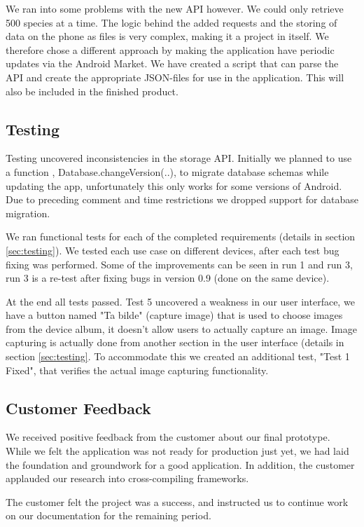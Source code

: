   We ran into some problems with the new API however. We could only retrieve 500
  species at a time. The logic behind the added requests and the storing of data
  on the phone as files is very complex, making it a project in itself. We
  therefore chose a different approach by making the application have periodic
  updates via the Android Market. We have created a script that can parse the
  API and create the appropriate JSON-files for use in the application. This
  will also be included in the finished product. 

\subsection{Testing}

Testing uncovered inconsistencies in the storage API. Initially we planned to
use a function , Database.changeVersion(..), to migrate database schemas while
updating the app, unfortunately this only works for some versions of Android.
Due to preceding comment and time restrictions we dropped support for database
migration.

We ran functional tests for each of the completed requirements (details in
section \ref{sec:testing}). We tested each use case on different devices, after
each test bug fixing was performed. Some of the improvements can be seen in run
1 and run 3, run 3 is a re-test after fixing bugs in version 0.9 (done on the
same device). 

At the end all tests passed. Test 5 uncovered a weakness in our user interface,
we have a button named "Ta bilde" (capture image) that is used to choose images
from the device album, it doesn't allow users to actually capture an image.
Image capturing is actually done from another section in the user interface
(details in section \ref{sec:testing}. To accommodate this we created an
additional test, "Test 1 Fixed", that verifies the actual image capturing
functionality.

\subsection{Customer Feedback}
We received positive feedback from the customer about our final prototype. While
we felt the application was not ready for production just yet, we had laid the
foundation and groundwork for a good application. In addition, the customer
applauded our research into cross-compiling frameworks.

The customer felt the project was a success, and instructed us to continue work
on our documentation for the remaining period. 

